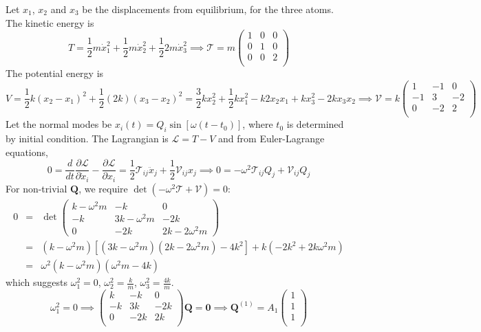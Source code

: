 \documentclass[a4paper]{article}
\begin{document}
\begin{ans}
Let $x_1$, $x_2$ and $x_3$ be the displacements from equilibrium, for the three atoms. The kinetic energy is 
$$T=\frac{1}{2}m\dot{x}_1^2+\frac{1}{2}m\dot{x}_2^2+\frac{1}{2}2m\dot{x}_3^2\implies \mathcal{T}=m\begin{pmatrix}1&0&0\\0&1&0\\0&0&2\\\end{pmatrix}$$
The potential energy is
$$V=\frac{1}{2}k(x_2-x_1)^2+\frac{1}{2}(2k)(x_3-x_2)^2=\frac{3}{2}kx_2^2+\frac{1}{2}kx_1^2-k2x_2x_1+kx_3^2-2kx_3x_2\implies \mathcal{V}=k\begin{pmatrix}1&-1&0\\-1&3&-2\\0&-2&2\\\end{pmatrix}$$
Let the normal modes be $x_i(t)=Q_i\sin[\omega(t-t_0)]$, where $t_0$ is determined by initial condition. The Lagrangian is $\mathcal{L}=T-V$ and from Euler-Lagrange equations,
$$0=\frac{d}{dt}\frac{\partial\mathcal{L}}{\partial\dot{x}_i}-\frac{\partial\mathcal{L}}{\partial x_i}=\frac{1}{2}\mathcal{T}_{ij}\ddot{x}_j+\frac{1}{2}\mathcal{V}_{ij}x_j\implies 0=-\omega^2\mathcal{T}_{ij}Q_j+\mathcal{V}_{ij}Q_j$$
For non-trivial $\mathbf{Q}$, we require $\det(-\omega^2\mathcal{T}+\mathcal{V})=0$:
\begin{eqnarray}
0&=&\det\begin{pmatrix}k-\omega^2m&-k&0\\-k&3k-\omega^2m&-2k\\0&-2k&2k-2\omega^2m\end{pmatrix}\nonumber\\&=&(k-\omega^2m)[(3k-\omega^2m)(2k-2\omega^2m)-4k^2]+k(-2k^2+2k\omega^2m)\nonumber\\&=&\omega^2(k-\omega^2m)(\omega^2m-4k)\nonumber
\end{eqnarray}
which suggests $\omega_1^2=0$, $\omega_2^2=\frac{k}{m}$, $\omega_3^2=\frac{4k}{m}$.
$$\omega_1^2=0\implies\begin{pmatrix}k&-k&0\\-k&3k&-2k\\0&-2k&2k\\\end{pmatrix}\mathbf{Q}=\boldsymbol{0}\implies\mathbf{Q}^{(1)}=A_1\begin{pmatrix}1\\1\\1\\\end{pmatrix}$$

\end{ans}
\end{document}
